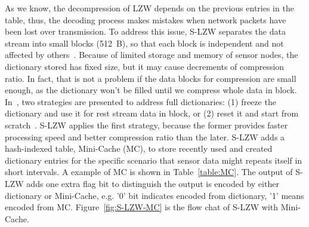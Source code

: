 As we know, the decompression of LZW depends on the previous entries in the
table, thus, the decoding process makes mistakes when network packets have been lost
over transmission. To address this issue, S-LZW separates the data stream into small
blocks (512~B), so that each block is independent and not affected by
others~\cite{sadler2006data}. Because of limited storage and memory of sensor
nodes, the dictionary stored has fixed size, but it may cause decrements of
compression ratio. In fact, that is not a problem if the data blocks for
compression are small enough, as the dictionary won't be filled until we compress
whole data in block. In~\cite{sadler2006data}, two strategies are presented to address
full dictionaries: (1) freeze the dictionary and use it for rest stream data in block,
or (2) reset it and start from scratch~\cite{sadler2006data}. S-LZW applies the first
strategy, because the former provides faster processing speed and better
compression ratio than the later. S-LZW adds a hash-indexed table,
Mini-Cache (MC), to store recently used and created dictionary entries for the
specific scenario that sensor data might repeats itself in short intervals. A
example of MC is shown in Table~\ref{table:MC}. The output of S-LZW adds one
extra flag bit to distinguish the output is encoded by either dictionary or
Mini-Cache, e.g. '0' bit indicates encoded from dictionary, '1' means encoded
from MC. Figure~\ref{fig:S-LZW-MC} is the flow chat of S-LZW with Mini-Cache.
